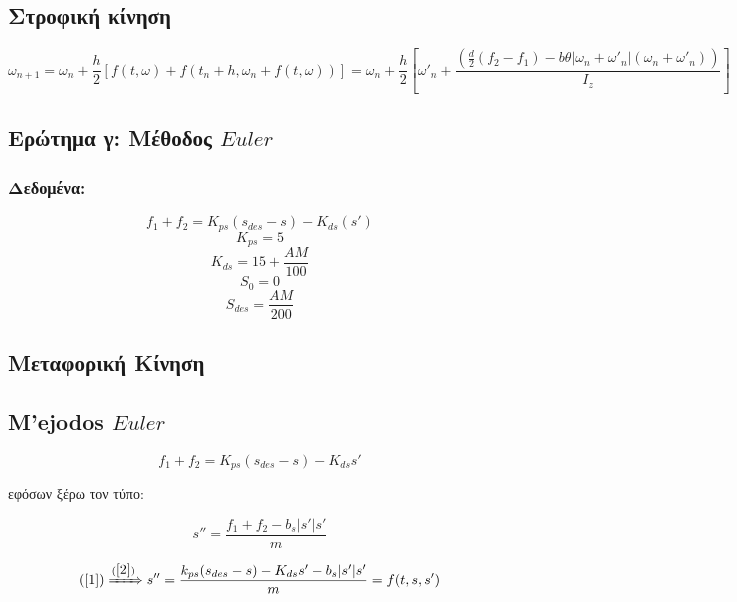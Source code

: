 \documentclass[a4paper]{article}
\begin{document}
        \subsection*{Στροφική κίνηση}

        \begin{dmath}
            \omega_{n+1}=\omega_n+\frac{h}{2}{[f(t, \omega)+f(t_n+h, \omega_n+f(t,\omega))]}=\omega_n+\frac{h}{2}{[\omega'_n+\frac{(\frac{d}{2}(f_2-f_1)-b\theta \lvert\omega_n+\omega'_n\rvert(\omega_n+\omega'_n))}{I_z}]}
        \end{dmath}
        \subsection{Eρώτημα γ: Μέθοδος $Euler$}

        \subsubsection{Δεδομένα:}
            \[f_1 + f_2 = K_{ps} (s_{des} - s) - K_{ds}(s')\]
            \[K_{ps} = 5\]
            \[K_{ds} = 15 + \frac{AM}{100}\]
            \[S_0 =0\]
            \[S_{des} = \frac{AM}{200}\]

        \subsection{Μεταφορική Κίνηση}
        \subsection{M'ejodos $Euler$}
        \begin{equation}
            f_1+f_2=K_{ps}(s_{des}-s)-K_{ds}s'
            \label{2}
        \end{equation}

        εφόσων ξέρω τον τύπο:

        \begin{equation}
            s''=\frac{f_1+f_2-b_s\rvert s'\lvert s'}{m}
            \label{1}
        \end{equation}

        \[(\ref{1}) \xRightarrow{(\ref{2})}s''=\frac{k_{ps}(s_{des}-s)-K_{ds}s'-b_s\rvert s'\lvert s'}{m}=f(t,s,s')\]
\end{document}

